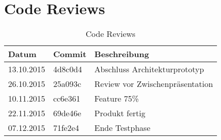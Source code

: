 \section{Code Reviews}
\label{sec:code_reviews}

\begin{table}[H]
\begin{tabularx}{\textwidth}{ l | l | X}
\textbf{Datum}& \textbf{Commit} & \textbf{Beschreibung}\\ \hline
13.10.2015 & 4d8c0d4 & Abschluss Architekturprototyp\\ \hline
26.10.2015 & 25a093c & Review vor Zwischenpräsentation\\ \hline
10.11.2015 & cc6e361 & Feature 75\%\\ \hline
22.11.2015 & 69de46e & Produkt fertig\\ \hline
07.12.2015 & 71fe2e4 & Ende Testphase\\ \hline
\end{tabularx}
\caption{Code Reviews}
\end{table}
